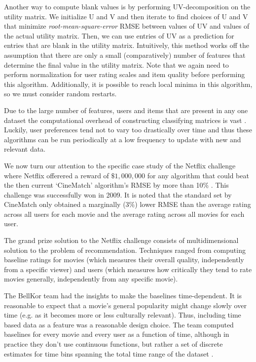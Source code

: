 \documentclass[11pt]{article}
\begin{document}
\par Another way to compute blank values is by performing UV-decomposition on the utility matrix. We initialize U and V and then iterate to find choices of U and V that minimize \textit{root-mean-square-error} RMSE between values of UV and values of the actual utility matrix. Then, we can use entries of UV as a prediction for entries that are blank in the utility matrix. Intuitively, this method works off the assumption that there are only a small (comparatively) number of features that determine the final value in the utility matrix. Note that we again need to perform normalization for user rating scales and item quality before performing this algorithm. Additionally, it is possible to reach local minima in this algorithm, so we must consider random restarts.
 \par Due to the large number of features, users and items that are present in any one dataset the computational overhead of constructing classifying matrices is vast \cite{chapter9}. Luckily, user preferences tend not to vary too drastically over time and thus these algorithms can be run periodically at a low frequency to update with new and relevant data.
\par We now turn our attention to the specific case study of the Netflix challenge where Netflix offerered a reward of $\$1,000,000$ for any algorithm that could beat the then current `CineMatch' algorithm's RMSE by more than 10\% \cite{chapter9}. This challenge was successfully won in 2009. It is noted that the standard set by CineMatch only obtained a marginally (3\%) lower RMSE than the average rating across all users for each movie and the average rating across all movies for each user.
\par The grand prize solution to the Netflix challenge \cite{netflix} consists of multidimensional solution to the problem of recommendation. Techniques ranged from computing baseline ratings for movies (which measures their overall quality, independently from a specific viewer) and users (which measures how critically they tend to rate movies generally, independently from any specific movie).
\par
The BellKor team had the insights to make the baselines time-dependent. It is reasonable to expect that a movie's general popularity might change slowly over time (e.g. as it becomes more or less culturally relevant). Thus, including time based data as a feature was a reasonable design choice. The team computed baselines for every movie and every user as a function of time, although in practice they don't use continuous functions, but rather a set of discrete estimates for time bins spanning the total time range of the dataset \cite{netflix}.
\end{document}
